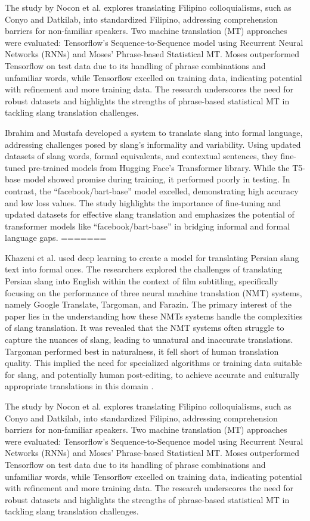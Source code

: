 The study by Nocon et al. \cite{Nocon_Kho_Arroyo_2018} explores translating Filipino colloquialisms, such as Conyo and Datkilab, into standardized Filipino, addressing comprehension barriers for non-familiar speakers. Two machine translation (MT) approaches were evaluated: Tensorflow's Sequence-to-Sequence model using Recurrent Neural Networks (RNNs) and Moses' Phrase-based Statistical MT. Moses outperformed Tensorflow on test data due to its handling of phrase combinations and unfamiliar words, while Tensorflow excelled on training data, indicating potential with refinement and more training data. The research underscores the need for robust datasets and highlights the strengths of phrase-based statistical MT in tackling slang translation challenges.

Ibrahim and Mustafa \cite{Abdulstar_Ibrahim_Shareef_Mustafa_2023} developed a system to translate slang into formal language, addressing challenges posed by slang's informality and variability. Using updated datasets of slang words, formal equivalents, and contextual sentences, they fine-tuned pre-trained models from Hugging Face's Transformer library. While the T5-base model showed promise during training, it performed poorly in testing. In contrast, the “facebook/bart-base” model excelled, demonstrating high accuracy and low loss values. The study highlights the importance of fine-tuning and updated datasets for effective slang translation and emphasizes the potential of transformer models like “facebook/bart-base” in bridging informal and formal language gaps. 
=======

Khazeni et al. used deep learning to create a model for translating Persian slang text into formal ones. The researchers explored the challenges of translating Persian slang into English within the context of film subtitling, specifically focusing on the performance of three neural machine translation (NMT) systems, namely Google Translate, Targoman, and Farazin. The primary interest of the paper lies in the understanding how these NMTs systems handle  the complexities of slang translation. It was revealed that the NMT systems often struggle to capture the nuances of slang, leading to unnatural and inaccurate translations. Targoman performed best in naturalness, it fell short of human translation quality. This implied the need for specialized algorithms or training data suitable for slang, and potentially human post-editing, to achieve accurate and culturally appropriate translations in this domain \cite{Khazeni}. 

The study by Nocon et al. \cite{Nocon_Kho_Arroyo_2018} explores translating Filipino colloquialisms, such as Conyo and Datkilab, into standardized Filipino, addressing comprehension barriers for non-familiar speakers. Two machine translation (MT) approaches were evaluated: Tensorflow's Sequence-to-Sequence model using Recurrent Neural Networks (RNNs) and Moses' Phrase-based Statistical MT. Moses outperformed Tensorflow on test data due to its handling of phrase combinations and unfamiliar words, while Tensorflow excelled on training data, indicating potential with refinement and more training data. The research underscores the need for robust datasets and highlights the strengths of phrase-based statistical MT in tackling slang translation challenges.

